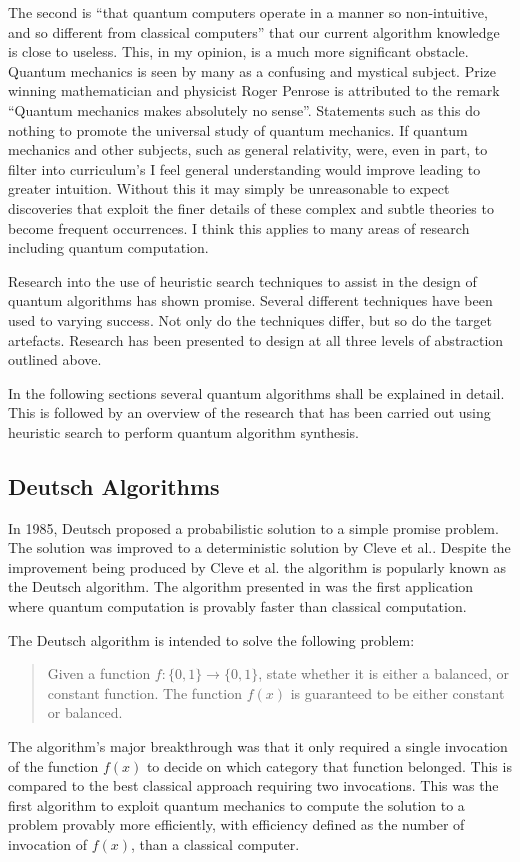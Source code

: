 The second is ``that quantum computers operate in a manner so non-intuitive, and so different from classical computers''\cite{Shor:2004:PQA:1032132.1032149} that our current algorithm knowledge is close to useless.
This, in my opinion, is a much more significant obstacle.
Quantum mechanics is seen by many as a confusing and mystical subject.
Prize winning mathematician and physicist Roger Penrose is attributed to the remark ``Quantum mechanics makes absolutely no sense''.
Statements such as this do nothing to promote the universal study of quantum mechanics.
If quantum mechanics and other subjects, such as general relativity, were, even in part, to filter into curriculum's I feel general understanding would improve leading to greater intuition.
Without this it may simply be unreasonable to expect discoveries that exploit the finer details of these complex and subtle theories to become frequent occurrences.
I think this applies to many areas of research including quantum computation.

Research into the use of heuristic search techniques to assist in the design of quantum algorithms has shown promise.
Several different techniques have been used to varying success.
Not only do the techniques differ, but so do the target artefacts.
Research has been presented to design at all three levels of abstraction outlined above.

In the following sections several quantum algorithms shall be explained in detail.
This is followed by an overview of the research that has been carried out using heuristic search to perform quantum algorithm synthesis.

\subsection{Deutsch Algorithms}
\label{sec:DeutAlg}
In 1985, Deutsch\cite{Deutsch85quantumtheory} proposed a probabilistic solution to a simple promise problem.
The solution was improved to a deterministic solution by Cleve et al.\cite{Cleve98quantumalgorithms}.
Despite the improvement being produced by Cleve et al. the algorithm is popularly known as the Deutsch algorithm.
The algorithm presented in \cite{Deutsch85quantumtheory} was the first application where quantum computation is provably faster than classical computation.

The Deutsch algorithm is intended to solve the following problem:
\begin{quote}
Given a function $f:\{0,1\}\to\{0,1\}$, state whether it is either a balanced, or constant function.
The function $f(x)$ is guaranteed to be either constant or balanced.
\end{quote}
The algorithm's major breakthrough was that it only required a single invocation of the function $f(x)$ to decide on which category that function belonged.
This is compared to the best classical approach requiring two invocations.
This was the first algorithm to exploit quantum mechanics to compute the solution to a problem provably more efficiently, with efficiency defined as the number of invocation of $f(x)$, than a classical computer.

